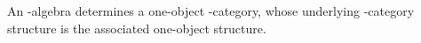 \begin{definition}
\label{AInfinityTheory.AInfinityAlgebra.toAInfinityCategory}
An \Ainf{}-algebra determines a one-object \Ainf{}-category, whose underlying
\Ainf{}-category structure is the associated one-object structure.
\end{definition}
